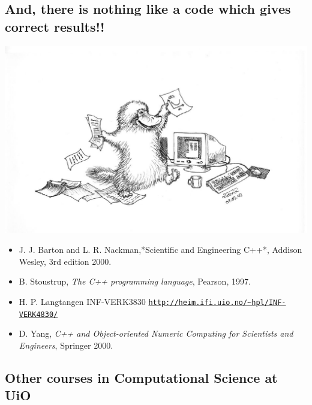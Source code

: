\documentclass[%
oneside,                 %
final,                   %
10pt]{article}
\begin{document}
\noindent
\subsection{And, there is nothing like a code which gives correct results!!}



\centerline{\includegraphics[width=0.6\linewidth]{fig-intro/Nebbdyr2.pdf}}



\begin{itemize}
 \item J. J. Barton and L. R. Nackman,*Scientific and Engineering C++*, Addison Wesley, 3rd edition 2000.

 \item B. Stoustrup, \emph{The C++ programming language}, Pearson, 1997.

 \item H. P. Langtangen INF-VERK3830 \href{{http://heim.ifi.uio.no/~hpl/INF-VERK4830/}}{\nolinkurl{http://heim.ifi.uio.no/~hpl/INF-VERK4830/}}

 \item D. Yang, \emph{C++ and Object-oriented Numeric Computing for Scientists and Engineers}, Springer 2000.
\end{itemize}

\noindent
\subsection{Other courses in Computational Science at UiO}


\end{document}
